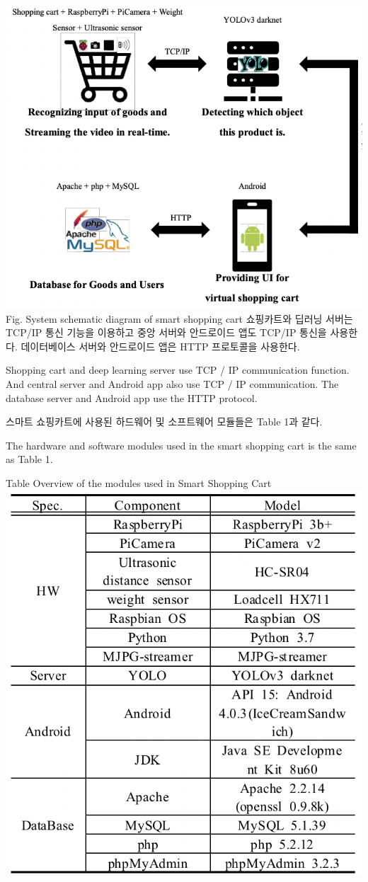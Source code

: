 \documentclass[smallextended]{svjour3}       %
\begin{document}
\includegraphics{../fig/fig3.png} Fig. System schematic diagram of smart
shopping cart 쇼핑카트와 딥러닝 서버는 TCP/IP 통신 기능을 이용하고 중앙
서버와 안드로이드 앱도 TCP/IP 통신을 사용한다. 데이터베이스 서버와
안드로이드 앱은 HTTP 프로토콜을 사용한다.

Shopping cart and deep learning server use TCP / IP communication
function. And central server and Android app also use TCP / IP
communication. The database server and Android app use the HTTP
protocol.

스마트 쇼핑카트에 사용된 하드웨어 및 소프트웨어 모듈들은 Table 1과 같다.

The hardware and software modules used in the smart shopping cart is the
same as Table 1.

Table Overview of the modules used in Smart Shopping Cart
\includegraphics{../fig/table1.png}
\end{document}
